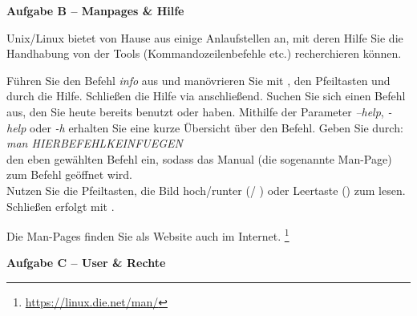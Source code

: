 \documentclass[paper=a4,fontsize=11pt]{scrartcl}%
\numberwithin{equation}{section}
\begin{document}
{\begin{center}\Large{\textbf{Aufgabe B -- Manpages \& Hilfe}}\end{center}\vskip0.25in
Unix/Linux bietet von Hause aus einige Anlaufstellen an, mit deren Hilfe Sie die Handhabung von der Tools (Kommandozeilenbefehle etc.) recherchieren können.
\begin{tasks}
	\task Führen Sie den Befehl \emph{info} aus und manövrieren Sie mit \keys{\tab}, den Pfeiltasten und \keys{\return} durch die Hilfe. Schließen die Hilfe via  anschließend.
	\task Suchen Sie sich einen Befehl aus, den Sie heute bereits benutzt oder haben. Mithilfe der Parameter \emph{--help}, \emph{-help} oder \emph{-h} erhalten Sie eine kurze Übersicht über den Befehl.
    \task Geben Sie durch: \\
    		\emph{man HIERBEFEHLKEINFUEGEN}\\
		den eben gewählten Befehl ein, sodass das Manual (die sogenannte Man-Page) zum Befehl geöffnet wird.\\
		 Nutzen Sie die Pfeiltasten, die Bild hoch/runter (/ ) oder Leertaste (\keys{\Space}) zum lesen. Schließen erfolgt mit .
\end{tasks}
Die Man-Pages finden Sie als Website auch im Internet. \footnote{\url{https://linux.die.net/man/}}

\begin{center}\Large{\textbf{Aufgabe C -- User \& Rechte}}\end{center}\vskip0.25in
\begin{enumerate}


\end{enumerate}}
\end{document}
